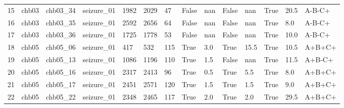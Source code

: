 \begin{table}[t]
\begin{tabular}{llllllllllllll}
15 & chb03 & chb03\_34 & seizure\_01 & 1982 & 2029 & 47 & False & nan & False & nan & True & 20.5 & A-B-C+ \\
16 & chb03 & chb03\_35 & seizure\_01 & 2592 & 2656 & 64 & False & nan & False & nan & True & 8.0 & A-B-C+ \\
17 & chb03 & chb03\_36 & seizure\_01 & 1725 & 1778 & 53 & False & nan & False & nan & True & 10.0 & A-B-C+ \\
18 & chb05 & chb05\_06 & seizure\_01 & 417 & 532 & 115 & True & 3.0 & True & 15.5 & True & 10.5 & A+B+C+ \\
19 & chb05 & chb05\_13 & seizure\_01 & 1086 & 1196 & 110 & True & 1.5 & False & nan & True & 11.5 & A+B-C+ \\
20 & chb05 & chb05\_16 & seizure\_01 & 2317 & 2413 & 96 & True & 0.5 & True & 5.5 & True & 8.0 & A+B+C+ \\
21 & chb05 & chb05\_17 & seizure\_01 & 2451 & 2571 & 120 & True & 1.5 & True & 1.5 & True & 9.0 & A+B+C+ \\
22 & chb05 & chb05\_22 & seizure\_01 & 2348 & 2465 & 117 & True & 2.0 & True & 2.0 & True & 29.5 & A+B+C+ \\
\bottomrule
\end{tabular}
\end{table}
